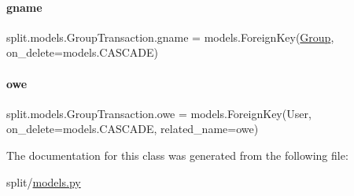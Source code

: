 \paragraph{\texorpdfstring{gname}{gname}}
{\footnotesize\ttfamily split.\+models.\+Group\+Transaction.\+gname = models.\+Foreign\+Key(\hyperlink{classsplit_1_1models_1_1Group}{Group}, on\+\_\+delete=models.\+C\+A\+S\+C\+A\+DE)\hspace{0.3cm}{\ttfamily [static]}}

\mbox{\label{classsplit_1_1models_1_1GroupTransaction_a0bbc00c7501cab8540c3af179b07ea08}} 
\paragraph{\texorpdfstring{owe}{owe}}
{\footnotesize\ttfamily split.\+models.\+Group\+Transaction.\+owe = models.\+Foreign\+Key(User, on\+\_\+delete=models.\+C\+A\+S\+C\+A\+DE, related\+\_\+name=\textquotesingle{}owe\textquotesingle{})\hspace{0.3cm}{\ttfamily [static]}}



The documentation for this class was generated from the following file\+:\begin{DoxyCompactItemize}
\item 
split/\hyperlink{split_2models_8py}{models.\+py}\end{DoxyCompactItemize}
